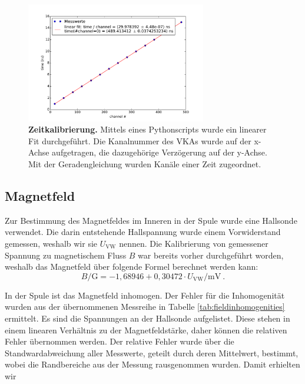 \documentclass[a4paper,ngerman]{scrartcl}
\begin{document}
\begin{figure}[tb!]
\centering
\includegraphics[width=0.7\textwidth]{abbildungen/zeitkalibrierung.pdf}
\caption[Zeitkalibrierung]{\textbf{Zeitkalibrierung.} Mittels eines Pythonscripts wurde ein linearer Fit durchgeführt. Die Kanalnummer des VKAs wurde auf der x-Achse aufgetragen, die dazugehörige Verzögerung auf der y-Achse. Mit der Geradengleichung wurden Kanäle einer Zeit zugeordnet.}
\label{fig:zeitkalibrierung}
\end{figure}



\subsection{Magnetfeld}

Zur Bestimmung des Magnetfeldes im Inneren in der Spule wurde eine Hallsonde verwendet.
Die darin entstehende Hallspannung wurde einem Vorwiderstand gemessen,
weshalb wir sie $U_{\mathrm{VW}}$ nennen.
Die Kalibrierung von gemessener Spannung zu magnetischem Fluss $B$ war bereits vorher durchgeführt worden,
weshalb das Magnetfeld über folgende Formel berechnet werden kann:
\begin{equation}
\label{eqn:B-gauss}
B \mathrm{/G} = -1,68946 + 0,30472 \cdot U_{\mathrm{VW}} \mathrm{/mV}~.
\end{equation}


In der Spule ist das Magnetfeld inhomogen. Der Fehler für die Inhomogenität wurden aus der übernommenen Messreihe in Tabelle \ref{tab:fieldinhomogenities} ermittelt. Es sind die Spannungen an der Hallsonde aufgelistet. Diese stehen in einem linearen Verhältnis zu der Magnetfeldstärke, daher können die relativen Fehler übernommen werden. 
Der relative Fehler wurde über die Standwardabweichung aller Messwerte, geteilt durch deren Mittelwert, bestimmt, wobei die Randbereiche aus der Messung rausgenommen wurden. Damit erhielten wir
\end{document}
